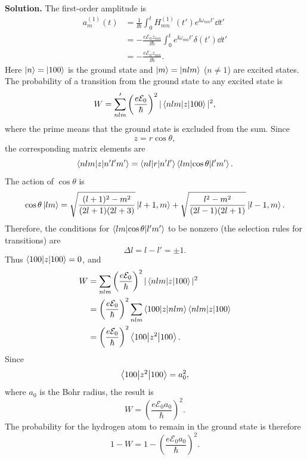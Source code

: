 \textbf{Solution.} The first-order amplitude is
\begin{equation}\begin{aligned}
 a_m^{(1)}(t)
 &=\frac1{\ii\hbar}\int_0^t H_{mn}^{(1)}(t')e^{\ii\omega_{mn}t'}\dd t'\\
 &=-\frac{e\mathcal E_0 z_{mn}}{\ii\hbar}
 \int_0^t e^{\ii\omega_{mn}t'}\delta(t')\dd t'\\
 &=-\frac{e\mathcal E_0 z_{mn}}{\ii\hbar}.
\end{aligned}\end{equation}
Here $\left|n\right\rangle=\left|100\right\rangle$ is the ground state and $\left|m\right\rangle=\left|nlm\right\rangle$ ($n\ne1$) are excited states. The probability of a transition from the ground state to any excited state is
\begin{equation}
 W=\sum_{nlm}'\left(\frac{e\mathcal E_0}{\hbar}\right)^2
 |\left\langle nlm\middle|z\middle|100\right\rangle|^2,
\end{equation}
where the prime means that the ground state is excluded from the sum. Since
\begin{equation}
 z=r\cos\theta,
\end{equation}
the corresponding matrix elements are
\begin{equation}
 \left\langle nlm\middle|z\middle|n'l'm'\right\rangle
 =\left\langle nl\middle|r\middle|n'l'\right\rangle\left\langle lm\middle|\cos\theta\middle|l'm'\right\rangle.
\end{equation}
The action of $\cos\theta$ is
\begin{equation}
 \cos\theta\left|lm\right\rangle
 =\sqrt{\frac{(l+1)^2-m^2}{(2l+1)(2l+3)}}\left|l+1,m\right\rangle
 +\sqrt{\frac{l^2-m^2}{(2l-1)(2l+1)}}\left|l-1,m\right\rangle.
\end{equation}
Therefore, the conditions for $\left\langle lm\middle|\cos\theta\middle|l'm'\right\rangle$ to be nonzero (the selection rules for transitions) are
\begin{equation}
 \Delta l=l-l'=\pm1.
\end{equation}
Thus $\left\langle100\middle|z\middle|100\right\rangle=0$, and
\begin{equation}\begin{aligned}
 W&=\sum_{nlm}\left(\frac{e\mathcal E_0}{\hbar}\right)^2
 |\left\langle nlm\middle|z\middle|100\right\rangle|^2\\
 &=\left(\frac{e\mathcal E_0}{\hbar}\right)^2
 \sum_{nlm}\left\langle100\middle|z\middle|nlm\right\rangle\left\langle nlm\middle|z\middle|100\right\rangle\\
 &=\left(\frac{e\mathcal E_0}{\hbar}\right)^2\left\langle100\middle|z^2\middle|100\right\rangle.
\end{aligned}\end{equation}
Since
\begin{equation}
 \left\langle100\middle|z^2\middle|100\right\rangle=a_0^2,
\end{equation}
where $a_0$ is the Bohr radius, the result is
\begin{equation}
 \boxed{W=\left(\frac{e\mathcal E_0 a_0}{\hbar}\right)^2}.
\end{equation}
The probability for the hydrogen atom to remain in the ground state is therefore
\begin{equation}
 \boxed{1-W=1-\left(\frac{e\mathcal E_0 a_0}{\hbar}\right)^2}.
\end{equation}


